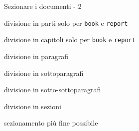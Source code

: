 \begin{frame}{Sezionare i documenti - 2}

\begin{description}[labelwidth=20pt]
	\item [\texttt{part}] divisione in parti solo per \texttt{book} e
	\texttt{report}
	\item [\texttt{chapter}] divisione in capitoli solo per \texttt{book} e 
	\texttt{report}
	\item [\texttt{section}] divisione in paragrafi
	\item [\texttt{subsection}] divisione in sottoparagrafi
	\item [\texttt{subsubsection}] divisione in sotto-sottoparagrafi
	\item [\texttt{paragraph}] divisione in sezioni
	\item [\texttt{subparagraph}] sezionamento più fine possibile
\end{description}

\end{frame}